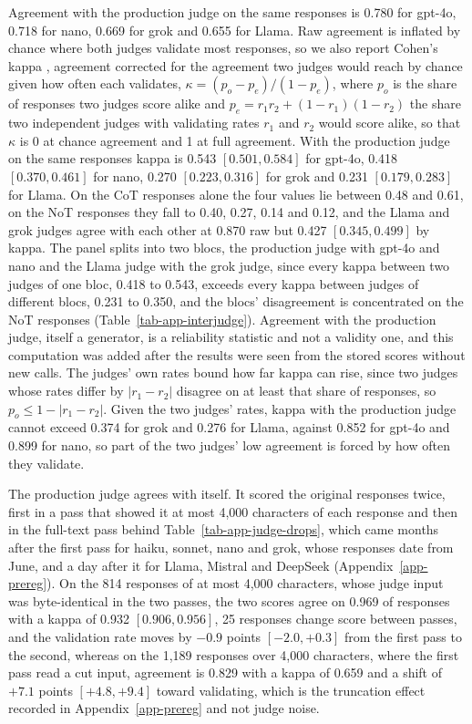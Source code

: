 Agreement with the production judge on the same responses is 0.780 for
gpt-4o, 0.718 for nano, 0.669 for grok and 0.655 for Llama.
Raw agreement is inflated by chance where both judges validate most
responses, so we also report Cohen's kappa \citep{cohen60}, agreement corrected for the
agreement two judges would reach by chance given how often each validates,
$\kappa=(p_o-p_e)/(1-p_e)$, where $p_o$ is the share of responses two judges
score alike and $p_e=r_1r_2+(1-r_1)(1-r_2)$ the share two independent judges
with validating rates $r_1$ and $r_2$ would score alike, so that $\kappa$ is
0 at chance agreement and 1 at full agreement.
With the production judge on the same responses kappa is 0.543
$[0.501, 0.584]$ for gpt-4o, 0.418 $[0.370, 0.461]$ for nano, 0.270
$[0.223, 0.316]$ for grok and 0.231 $[0.179, 0.283]$ for Llama. On the CoT
responses alone the four values lie between 0.48 and 0.61, on the NoT
responses they fall to 0.40, 0.27, 0.14 and 0.12, and the Llama and grok
judges agree with each other at 0.870 raw but 0.427 $[0.345, 0.499]$ by
kappa. The panel splits into two blocs, the production judge with gpt-4o and
nano and the Llama judge with the grok judge, since every kappa between two
judges of one bloc, 0.418 to 0.543, exceeds every kappa between judges of
different blocs, 0.231 to 0.350, and the blocs' disagreement is concentrated
on the NoT responses (Table~\ref{tab-app-interjudge}).
Agreement with the production judge, itself a generator, is a reliability
statistic and not a validity one, and this computation was added after the
results were seen from the stored scores without new calls.
The judges' own rates bound how far kappa can rise, since two judges whose
rates differ by $|r_1-r_2|$ disagree on at least that share of responses, so
$p_o\le 1-|r_1-r_2|$. Given the two judges' rates, kappa with the production
judge cannot exceed 0.374 for grok
and 0.276 for Llama, against 0.852 for gpt-4o and 0.899 for nano, so part of
the two judges' low agreement is forced by how often they validate.

The production judge agrees with itself. It scored the original responses
twice, first in a pass that showed it at most 4,000 characters of each
response and then in the full-text pass behind
Table~\ref{tab-app-judge-drops}, which came months after the first pass for
haiku, sonnet, nano and grok, whose responses date from June, and a day after
it for Llama, Mistral and DeepSeek (Appendix~\ref{app-prereg}). On the 814
responses of at most 4,000 characters, whose judge input was byte-identical
in the two passes, the two scores agree on 0.969 of responses with a kappa of
0.932 $[0.906, 0.956]$, 25 responses change score between passes, and the
validation rate moves by $-0.9$ points $[-2.0, +0.3]$ from the first pass to
the second, whereas on the 1,189 responses over 4,000 characters,
where the first pass read a cut input, agreement is 0.829 with a kappa of
0.659 and a shift of $+7.1$ points $[+4.8, +9.4]$ toward validating, which
is the truncation effect recorded in Appendix~\ref{app-prereg} and not
judge noise.


